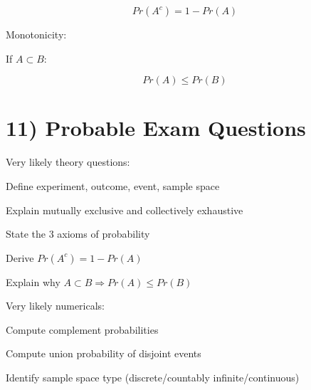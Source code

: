 \documentclass[12pt,a4paper]{article}
\begin{document}
\[
Pr(A^c)=1-Pr(A)
\]

Monotonicity:

If $A \subset B$:

\[
Pr(A) \le Pr(B)
\]

\section*{11) Probable Exam Questions}

Very likely theory questions:

Define experiment, outcome, event, sample space

Explain mutually exclusive and collectively exhaustive

State the 3 axioms of probability

Derive $Pr(A^c)=1-Pr(A)$

Explain why $A \subset B \Rightarrow Pr(A) \le Pr(B)$

Very likely numericals:

Compute complement probabilities

Compute union probability of disjoint events

Identify sample space type (discrete/countably infinite/continuous)
\end{document}
